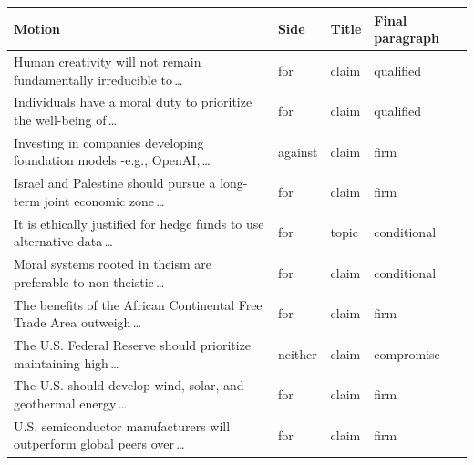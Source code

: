 \begin{tabular}{p{5.2cm}lll}
\toprule
Motion & Side & Title & Final paragraph \\
\midrule
Human creativity will not remain fundamentally irreducible to\,\ldots & for & claim & qualified \\
Individuals have a moral duty to prioritize the well-being of\,\ldots & for & claim & qualified \\
Investing in companies developing foundation models -e.g., OpenAI,\,\ldots & against & claim & firm \\
Israel and Palestine should pursue a long-term joint economic zone\,\ldots & for & claim & firm \\
It is ethically justified for hedge funds to use alternative data\,\ldots & for & topic & conditional \\
Moral systems rooted in theism are preferable to non-theistic\,\ldots & for & claim & conditional \\
The benefits of the African Continental Free Trade Area outweigh\,\ldots & for & claim & firm \\
The U.S. Federal Reserve should prioritize maintaining high\,\ldots & neither & claim & compromise \\
The U.S. should develop wind, solar, and geothermal energy\,\ldots & for & claim & firm \\
U.S. semiconductor manufacturers will outperform global peers over\,\ldots & for & claim & firm \\
\bottomrule
\end{tabular}
